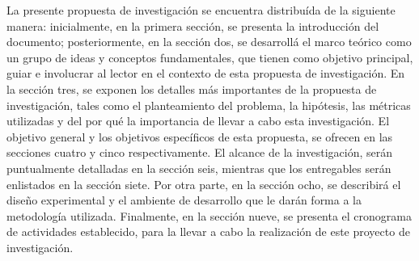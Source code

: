 La presente propuesta de investigaci\'on se encuentra distribu\'ida de la siguiente manera: inicialmente, en la primera secci\'on, se presenta la introducci\'on del documento; posteriormente, en la secci\'on dos, se desarroll\'a el marco te\'orico como un grupo de ideas y conceptos fundamentales, que tienen como objetivo principal, guiar e involucrar al lector en el contexto de esta propuesta de investigaci\'on. En la secci\'on tres, se exponen los detalles m\'as importantes de la propuesta de investigaci\'on, tales como el planteamiento del problema, la hip\'otesis, las m\'etricas utilizadas y del por qu\'e la importancia de llevar a cabo esta investigaci\'on. El objetivo general y los objetivos espec\'ificos de esta propuesta, se ofrecen en las secciones cuatro y cinco respectivamente. El alcance de la investigaci\'on, ser\'an puntualmente detalladas en la secci\'on seis, mientras que los entregables ser\'an enlistados en la secci\'on siete. Por otra parte, en la secci\'on ocho, se describir\'a el dise\~no experimental y el ambiente de desarrollo que le dar\'an forma a la metodolog\'ia utilizada. Finalmente, en la secci\'on nueve, se presenta el cronograma de actividades establecido, para la llevar a cabo la realizaci\'on de este proyecto de investigaci\'on.